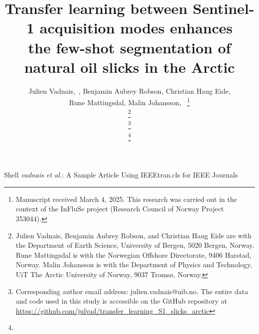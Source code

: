 \documentclass[lettersize,journal]{IEEEtran}
\begin{document}
\title{Transfer learning between Sentinel-1 acquisition modes enhances \\ the few-shot segmentation of natural oil slicks in the Arctic}

\author{
    Julien Vadnais,~, 
    Benjamin Aubrey Robson, 
    Christian Haug Eide, \\
    Rune Mattingsdal, 
    Malin Johansson,~ 
\thanks{Manuscript received March 4, 2025. This research was carried out in the context of the InFluSe project (Research Council of Norway Project 353044).}

\thanks{Julien Vadnais, Benjamin Aubrey Robson, and Christian Haug Eide are with the Department of Earth Science, University of Bergen, 5020 Bergen, Norway.
Rune Mattingsdal is with the Norwegian Offshore Directorate, 9406 Harstad, Norway.
Malin Johansson is with the Department of Physics and Technology, UiT The Arctic University of Norway, 9037 Tromsø, Norway.} 

\thanks{Corresponding author email address: julien.vadnais@uib.no. The entire data and code used in this study is accessible on the GitHub repository at \\ 
\url{https://github.com/julvad/transfer_learning_S1_slicks_arctic}}
 
\thanks{}%
}

{Shell \MakeLowercase{\textit{Vadnais et al.}}: A Sample Article Using IEEEtran.cls for IEEE Journals}

\end{document}
